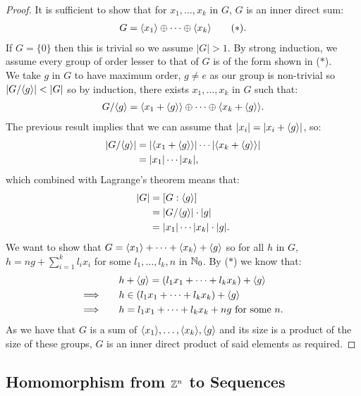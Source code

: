 \begin{proof}
    It is sufficient to show that for $x_1, \ldots, x_k$ in $G$, $G$
    is an inner direct sum: \begin{align*}
        G = \langle x_1 \rangle \oplus \cdots \oplus \langle x_k \rangle \tag{$\ast$}.
    \end{align*} If $G = \{0\}$ then this is trivial so we assume $|G| > 1$.
    By strong induction, we assume every group of order lesser to that of
    $G$ is of the form shown in ($\ast$).
    \\[\baselineskip]
    We take $g$ in $G$ to have maximum order, $g \neq e$ as our group is
    non-trivial so $|G / \langle g \rangle| < |G|$ so by induction, there exists
    $x_1, \ldots, x_k$ in $G$ such that: \begin{align*}
        G / \langle g \rangle = \langle x_1 + \langle g \rangle \rangle \oplus \cdots \oplus
        \langle x_k + \langle g \rangle \rangle.
    \end{align*} The previous result implies that we can assume that 
    $|x_i| = |x_i + \langle g \rangle|$, so: \begin{align*}
        |G/\langle g \rangle| 
        &= |\langle x_1 + \langle g \rangle \rangle| \cdots |\langle x_k + \langle g \rangle \rangle| \\
        &= |x_1| \cdots |x_k|,
    \end{align*} which combined with Lagrange's theorem means that: \begin{align*}
        |G| &= [G : \langle g \rangle] \\
        &= |G / \langle g \rangle| \cdot |g| \\
        &= |x_1| \cdots |x_k| \cdot |g|.
    \end{align*} We want to show that $G = \langle x_1 \rangle + \cdots + \langle x_k \rangle + \langle g \rangle$
    so for all $h$ in $G$, $h = ng + \sum_{i = 1}^k l_ix_i$ for some
    $l_1, \ldots, l_k, n$ in $\mathbb{N}_0$. By ($\ast$) we know that: \begin{align*}
        &h + \langle g \rangle = (l_1x_1 + \cdots + l_kx_k) + \langle g \rangle \\
        \Longrightarrow \qquad&
        h \in (l_1x_1 + \cdots + l_kx_k) + \langle g \rangle \\
        \Longrightarrow \qquad&
        h = l_1x_1 + \cdots + l_kx_k + ng \text{ for some } n.
    \end{align*} As we have that $G$ is a sum of $\langle x_1 \rangle, \ldots, \langle x_k \rangle,
    \langle g \rangle$ and its size is a product of the size of these groups, $G$
    is an inner direct product of said elements as required.
\end{proof}

\subsection{Homomorphism from $\mathbb{Z}^n$ to Sequences}

